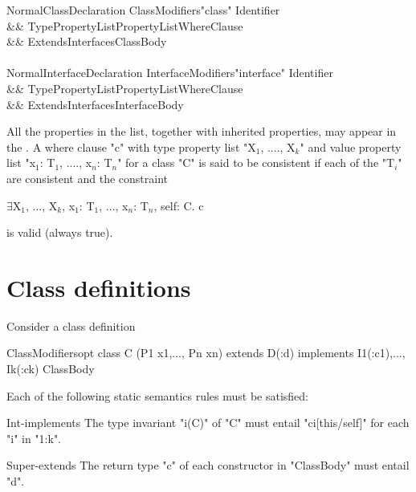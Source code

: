 \begin{grammar}
NormalClassDeclaration \:
      ClassModifiers\opt \xcd"class" Identifier  \\
   && TypePropertyList\opt PropertyList\opt WhereClause\opt \\
   && Extends\opt Interfaces\opt ClassBody \\
\\
NormalInterfaceDeclaration \:
      InterfaceModifiers\opt \xcd"interface" Identifier  \\
   && TypePropertyList\opt PropertyList\opt WhereClause\opt \\
   && ExtendsInterfaces\opt InterfaceBody \\
\end{grammar}

All the properties in the list, together with inherited properties,
may appear in the . A where clause \xcd"c" with
type property list \xcdmath"X$_1$, ...., X$_k$"
and value property list \xcdmath"x$_1$: T$_1$, ...., x$_n$: T$_n$"
for a class \xcd"C" is said to be consistent if each of the \xcdmath"T$_i$" are
consistent and the constraint
\begin{xtenmath}
$\exists$X$_1$, $\dots$, X$_k$, x$_1$: T$_1$, $\dots$, x$_n$: T$_n$, self: C. c
\end{xtenmath}
\noindent is valid (always true).

\section{Class definitions}

Consider a class definition
\begin{xten}
ClassModifiersopt 
 class C (P1 x1,..., Pn xn)  extends D(:d) 
   implements I1(:c1),..., Ik(:ck)
 ClassBody  
\end{xten}

Each of the following static semantics rules must be satisfied:

\begin{staticrule}{Int-implements}
The type invariant \xcd"i(C)" of \xcd"C" must entail
\xcd"ci[this/self]" for each \xcd"i" in \xcd"1:k".  
\end{staticrule}

\begin{staticrule}{Super-extends}
The return type \xcd"c" of each constructor in \xcd"ClassBody"
must entail \xcd"d".
\end{staticrule}

